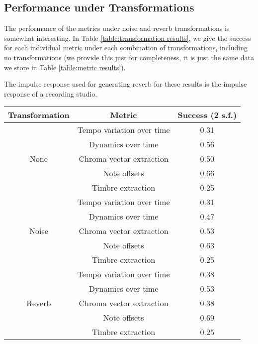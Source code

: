 \documentclass[oneside, class=book, 12pt, crop=false]{standalone}
\begin{document}
\subsection{Performance under Transformations}

The performance of the metrics under noise and reverb transformations is somewhat interesting. In Table \ref{table:transformation results}, we give the success for each individual metric under each combination of transformations, including no transformations (we provide this just for completeness, it is just the same data we store in Table \ref{table:metric results}).

The impulse response used for generating reverb for these results is the impulse response of a recording studio.

\begin{table}[h]
    \centering
    \begin{tabular}{c|cc}
        \textbf{Transformation}&\textbf{Metric}&\textbf{Success} (2 s.f.) \\
        \midrule[0.15em]
        \multirow{5}{*}{None} &Tempo variation over time&0.31 \\ \cline{2-3}
                              &Dynamics over time&0.56 \\ \cline{2-3}
                              &Chroma vector extraction&0.50 \\ \cline{2-3}
                              &Note offsets&0.66 \\ \cline{2-3}
                              &Timbre extraction&0.25\\ \midrule[0.1em]
        \multirow{5}{*}{Noise} & Tempo variation over time & 0.31 \\ \cline{2-3}
                               &Dynamics over time & 0.47 \\ \cline{2-3}
                               &Chroma vector extraction & 0.53 \\ \cline{2-3}
                               &Note offsets & 0.63 \\ \cline{2-3}
                               &Timbre extraction & 0.25 \\ \midrule[0.1em]
        \multirow{5}{*}{Reverb} & Tempo variation over time & 0.38 \\ \cline{2-3}
                                &Dynamics over time & 0.53 \\ \cline{2-3}
                                &Chroma vector extraction & 0.38 \\ \cline{2-3}
                                &Note offsets & 0.69 \\ \cline{2-3}
                                &Timbre extraction & 0.25 \\ \midrule[0.1em]


\end{tabular}
\end{table}
\end{document}

